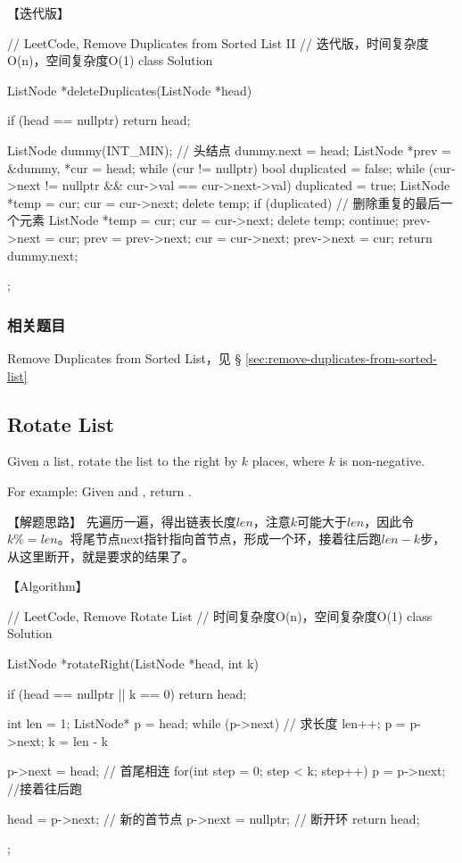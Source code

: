 【迭代版】
\begin{Code}
	// LeetCode, Remove Duplicates from Sorted List II
	// 迭代版，时间复杂度O(n)，空间复杂度O(1)
	class Solution {
		ListNode *deleteDuplicates(ListNode *head) {
			if (head == nullptr) return head;
			
			ListNode dummy(INT_MIN); // 头结点
			dummy.next = head;
			ListNode *prev = &dummy, *cur = head;
			while (cur != nullptr) {
				bool duplicated = false;
				while (cur->next != nullptr && cur->val == cur->next->val) {
					duplicated = true;
					ListNode *temp = cur;
					cur = cur->next;
					delete temp;
				}
				if (duplicated) { // 删除重复的最后一个元素
					ListNode *temp = cur;
					cur = cur->next;
					delete temp;
					continue;
				}
				prev->next = cur;
				prev = prev->next;
				cur = cur->next;
			}
			prev->next = cur;
			return dummy.next;
		}
	};
\end{Code}


\subsubsection{相关题目}

\begindot
\item Remove Duplicates from Sorted List，见 \S
\ref{sec:remove-duplicates-from-sorted-list}
\myenddot


\subsection{Rotate List}
\label{sec:rotate-list}



Given a list, rotate the list to the right by $k$ places, where $k$ is
non-negative.

For example:
Given  and , return
.


【解题思路】
先遍历一遍，得出链表长度$len$，注意$k$可能大于$len$，因此令$k \%=
len$。将尾节点next指针指向首节点，形成一个环，接着往后跑$len-k$步，从这里断开，就是要求的结果了。


【Algorithm】
\begin{Code}
	// LeetCode, Remove Rotate List
	// 时间复杂度O(n)，空间复杂度O(1)
	class Solution {
		ListNode *rotateRight(ListNode *head, int k) {
			if (head == nullptr || k == 0) return head;
			
			int len = 1;
			ListNode* p = head;
			while (p->next) { // 求长度
				len++;
				p = p->next;
			}
			k = len - k %
			
			p->next = head; // 首尾相连
			for(int step = 0; step < k; step++)
				p = p->next;  //接着往后跑
			
			head = p->next; // 新的首节点
			p->next = nullptr; // 断开环
			return head;
		}
	};
\end{Code}


